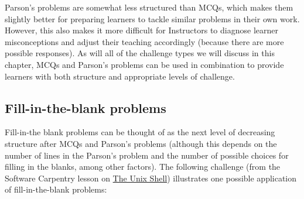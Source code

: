 \documentclass[]{book}
\begin{document}
Parson's problems are somewhat less structured than MCQs, which makes them slightly
better for preparing learners to tackle similar problems in their own work. However, this also
makes it more difficult for Instructors to diagnose learner misconceptions and adjust their
teaching accordingly (because there are more possible responses). As will all of the challenge
types we will discuss in this chapter, MCQs and Parson's problems can be used in combination
to provide learners with both structure and appropriate levels of challenge.

\hypertarget{fill-in-the-blank-problems}{%
\subsection{Fill-in-the-blank problems}\label{fill-in-the-blank-problems}}

Fill-in-the blank problems can be thought of as the next level of decreasing structure after
MCQs and Parson's problems (although this depends on the number of lines in the Parson's
problem and the number of possible choices for filling in the blanks, among other factors).
The following challenge (from the Software Carpentry lesson on
\href{http://swcarpentry.github.io/shell-novice/}{The Unix Shell}) illustrates one possible
application of fill-in-the-blank problems:
\end{document}
